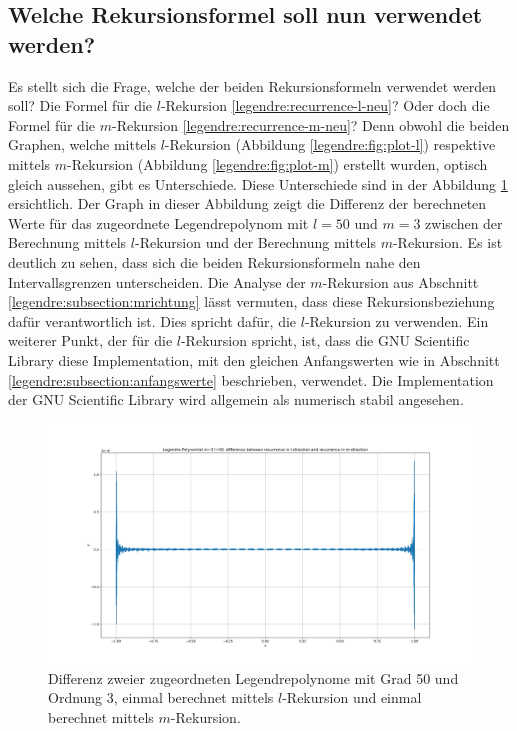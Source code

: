 \subsection{Welche Rekursionsformel soll nun verwendet werden?
\label{legendre:subsection:welche}}
Es stellt sich die Frage, welche der beiden Rekursionsformeln verwendet werden soll?
Die Formel für die $l$-Rekursion \eqref{legendre:recurrence-l-neu}?
Oder doch die Formel für die $m$-Rekursion \eqref{legendre:recurrence-m-neu}?
Denn obwohl die beiden Graphen, welche mittels $l$-Rekursion (Abbildung \ref{legendre:fig:plot-l}) respektive mittels $m$-Rekursion (Abbildung \ref{legendre:fig:plot-m}) erstellt wurden, optisch gleich aussehen, gibt es Unterschiede.
Diese Unterschiede sind in der Abbildung \ref{legendre:fig:plot-diff} ersichtlich.
Der Graph in dieser Abbildung zeigt die Differenz der berechneten Werte für das zugeordnete Legendrepolynom mit $l=50$ und $m=3$ zwischen der Berechnung mittels $l$-Rekursion und der Berechnung mittels $m$-Rekursion.
Es ist deutlich zu sehen, dass sich die beiden Rekursionsformeln nahe den Intervallsgrenzen unterscheiden.
Die Analyse der $m$-Rekursion aus Abschnitt \ref{legendre:subsection:mrichtung} lässt vermuten, dass diese Rekursionsbeziehung dafür verantwortlich ist.
Dies spricht dafür, die $l$-Rekursion zu verwenden.
Ein weiterer Punkt, der für die $l$-Rekursion spricht, ist, dass die GNU Scientific Library \cite{legendre:gsl} diese Implementation, mit den gleichen Anfangswerten wie in Abschnitt \ref{legendre:subsection:anfangswerte} beschrieben, verwendet.
Die Implementation der GNU Scientific Library wird allgemein als numerisch stabil angesehen.
\begin{figure}[!h]
\centering
\includegraphics[width=1.0\linewidth]{papers/legendre/plots/plot_diff_l_m}
\caption{Differenz zweier zugeordneten Legendrepolynome mit Grad 50 und Ordnung 3, einmal berechnet mittels \texorpdfstring{$l$}{l}-Rekursion und einmal berechnet mittels \texorpdfstring{$m$}{m}-Rekursion.}
\label{legendre:fig:plot-diff}
\end{figure}
